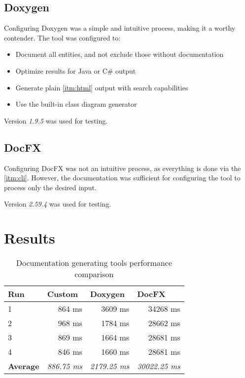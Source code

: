 \subsection{Doxygen}

Configuring Doxygen was a simple and intuitive process, making it a worthy contender. The tool was configured to:
\begin{itemize}
    \item Document all entities, and not exclude those without documentation
    \item Optimize results for Java or C\# output
    \item Generate plain \ref{itm:html} output with search capabilities
    \item Use the built-in class diagram generator
\end{itemize}

Version \textit{1.9.5} was used for testing.

\subsection{DocFX}

Configuring DocFX was not an intuitive process, as everything is done via the \ref{itm:cli}. However, the documentation was sufficient for configuring the tool to process only the desired input.

Version \textit{2.59.4} was used for testing.

\section{Results}

\begin{table}[H]
    \centering
    \label{tab:toolPerformance}
    \begin{tabular}{lrrr}
    \hline
    \textbf{Run}            & \multicolumn{1}{l}{\textbf{Custom}}    & \multicolumn{1}{l}{\textbf{Doxygen}}    & \multicolumn{1}{l}{\textbf{DocFX}}       \\ \hline
    \multicolumn{1}{|l|}{1} & \multicolumn{1}{r|}{864 ms}            & \multicolumn{1}{r|}{3609 ms}            & \multicolumn{1}{r|}{34268 ms}            \\ \hline
    \multicolumn{1}{|l|}{2} & \multicolumn{1}{r|}{968 ms}            & \multicolumn{1}{r|}{1784 ms}            & \multicolumn{1}{r|}{28662 ms}            \\ \hline
    \multicolumn{1}{|l|}{3} & \multicolumn{1}{r|}{869 ms}            & \multicolumn{1}{r|}{1664 ms}            & \multicolumn{1}{r|}{28681 ms}            \\ \hline
    \multicolumn{1}{|l|}{4} & \multicolumn{1}{r|}{846 ms}            & \multicolumn{1}{r|}{1660 ms}            & \multicolumn{1}{r|}{28681 ms}            \\ \hline
    \textbf{Average}        & \multicolumn{1}{l}{\textit{886.75 ms}} & \multicolumn{1}{l}{\textit{2179.25 ms}} & \multicolumn{1}{l}{\textit{30022.25 ms}} \\ \hline
    \end{tabular}
    \caption{Documentation generating tools performance comparison}
\end{table}

